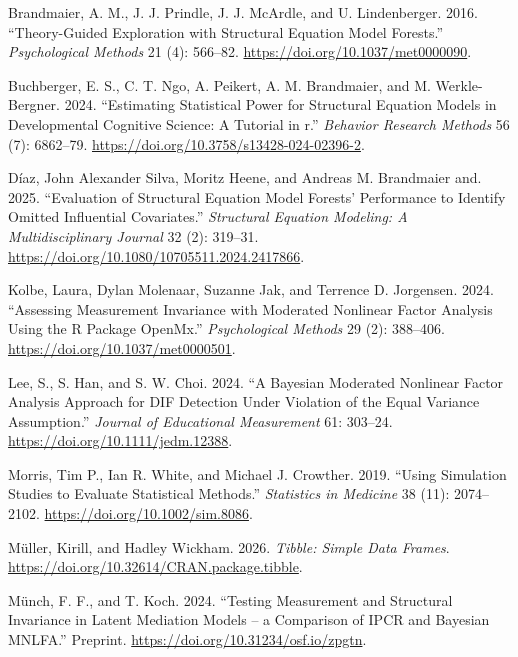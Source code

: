 \documentclass[
  man,
  floatsintext]{apa7}
\newlength{\cslhangindent}
\newenvironment{CSLReferences}[2] %
 {\begin{list}{}{%
  \setlength{\itemindent}{0pt}
  \setlength{\leftmargin}{0pt}
  \setlength{\parsep}{0pt}
  \ifodd #1
   \setlength{\leftmargin}{\cslhangindent}
   \setlength{\itemindent}{-1\cslhangindent}
  \fi
  \setlength{\itemsep}{#2\baselineskip}}}
 {\end{list}}
\begin{document}
\begin{CSLReferences}{1}{0}
Brandmaier, A. M., J. J. Prindle, J. J. McArdle, and U. Lindenberger.
2016. {``Theory-Guided Exploration with Structural Equation Model
Forests.''} \emph{Psychological Methods} 21 (4): 566--82.
\url{https://doi.org/10.1037/met0000090}.

Buchberger, E. S., C. T. Ngo, A. Peikert, A. M. Brandmaier, and M.
Werkle-Bergner. 2024. {``Estimating Statistical Power for Structural
Equation Models in Developmental Cognitive Science: A Tutorial in r.''}
\emph{Behavior Research Methods} 56 (7): 6862--79.
\url{https://doi.org/10.3758/s13428-024-02396-2}.

Díaz, John Alexander Silva, Moritz Heene, and Andreas M. Brandmaier and.
2025. {``Evaluation of Structural Equation Model Forests' Performance to
Identify Omitted Influential Covariates.''} \emph{Structural Equation
Modeling: A Multidisciplinary Journal} 32 (2): 319--31.
\url{https://doi.org/10.1080/10705511.2024.2417866}.

Kolbe, Laura, Dylan Molenaar, Suzanne Jak, and Terrence D. Jorgensen.
2024. {``{Assessing Measurement Invariance with Moderated Nonlinear
Factor Analysis Using the R Package OpenMx}.''} \emph{Psychological
Methods} 29 (2): 388--406. \url{https://doi.org/10.1037/met0000501}.

Lee, S., S. Han, and S. W. Choi. 2024. {``A Bayesian Moderated Nonlinear
Factor Analysis Approach for DIF Detection Under Violation of the Equal
Variance Assumption.''} \emph{Journal of Educational Measurement} 61:
303--24. \url{https://doi.org/10.1111/jedm.12388}.

Morris, Tim P., Ian R. White, and Michael J. Crowther. 2019. {``Using
Simulation Studies to Evaluate Statistical Methods.''} \emph{Statistics
in Medicine} 38 (11): 2074--2102.
\url{https://doi.org/10.1002/sim.8086}.

Müller, Kirill, and Hadley Wickham. 2026. \emph{Tibble: Simple Data
Frames}. \url{https://doi.org/10.32614/CRAN.package.tibble}.

Münch, F. F., and T. Koch. 2024. {``Testing Measurement and Structural
Invariance in Latent Mediation Models -- a Comparison of IPCR and
Bayesian MNLFA.''} Preprint.
\url{https://doi.org/10.31234/osf.io/zpgtn}.


\end{CSLReferences}
\end{document}
